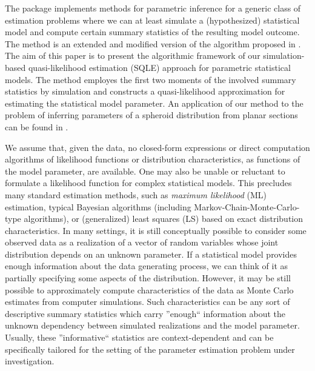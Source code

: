 The  package  implements methods for parametric inference
for a generic class of estimation problems where we can at least simulate a
(hypothesized) statistical model and compute certain summary statistics of
the resulting model outcome. The method is an extended and modified
version of the algorithm proposed in \citet{Baaske2014}. The aim of this paper
is to present the algorithmic framework of our simulation-based quasi-likelihood
estimation (SQLE) approach for parametric statistical models. The method
employes the first two moments of the involved summary statistics by simulation and
constructs a quasi-likelihood approximation for estimating the statistical model
parameter. An application of our method to the problem of inferring parameters
of a spheroid distribution from planar sections can be found in \citet{Baaske2018}.\par
%
We assume that, given the data, no closed-form expressions or direct computation
algorithms of likelihood functions or distribution characteristics, as functions of the
model parameter, are available. One may also be unable or reluctant to formulate
a likelihood function for complex statistical models. This precludes many standard
estimation methods, such as \emph{maximum likelihood} (ML) estimation,
typical Bayesian algorithms (including Markov-Chain-Monte-Carlo-type algorithms), or (generalized) least
squares (LS) based on exact distribution characteristics. In many settings, it is still conceptually
possible to consider some observed data as a realization of a vector of random
variables whose joint distribution depends on an unknown parameter. If a statistical model provides enough
information about the data generating process, we can think of it as partially
specifying some aspects of the distribution. However, it may be still possible to approximately compute
characteristics of the data as Monte Carlo estimates from computer simulations.
Such characteristics can be any sort of descriptive summary statistics which carry ''enough`` information
about the unknown dependency between simulated realizations and the model
parameter. Usually, these ''informative`` statistics are context-dependent and can be specifically tailored for the
setting of the parameter estimation problem under investigation.\par
%
